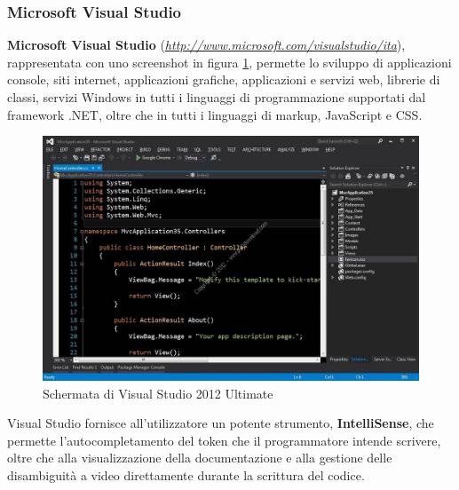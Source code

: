 


\subsubsection{Microsoft Visual Studio}
\textbf{Microsoft Visual Studio} (\emph{\url{http://www.microsoft.com/visualstudio/ita}}), rappresentata con uno screenshot in figura \ref{vsimage}, permette lo sviluppo di applicazioni console, siti internet, applicazioni grafiche, applicazioni e servizi web, librerie di classi, servizi Windows in tutti i linguaggi di programmazione supportati dal framework .NET, oltre che in tutti i linguaggi di markup, JavaScript e CSS.

\begin{figure}
\begin{center}

\includegraphics[scale=0.3]{imgs/visualstudio.jpg} 
\caption{Schermata di Visual Studio 2012 Ultimate\label{vsimage}}
\end{center}

\end{figure}
Visual Studio fornisce all’utilizzatore un potente strumento, \textbf{IntelliSense}, che permette
l'autocompletamento del token che il programmatore intende scrivere, oltre che
alla visualizzazione della documentazione e alla gestione delle disambiguità a
video direttamente durante la scrittura del codice.

